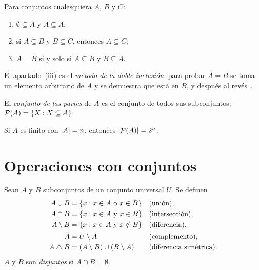 \begin{proposicion}\label{prop:t1-subconj}
Para conjuntos cualesquiera $A$, $B$ y $C$:
\begin{enumerate}
  \item $\emptyset\subseteq A$ y $A\subseteq A$;
  \item si $A\subseteq B$ y $B\subseteq C$, entonces $A\subseteq C$;
  \item $A=B$ si y solo si $A\subseteq B$ y $B\subseteq A$.
\end{enumerate}
\end{proposicion}

El apartado~(iii) es el \emph{método de la doble inclusión}: para probar $A=B$ se toma un elemento arbitrario de $A$ y se demuestra que está en $B$, y después al revés~\cite[§8.3]{hammack}.

\begin{definicion}
El \emph{conjunto de las partes} de $A$ es el conjunto de todos sus subconjuntos: $\mathcal{P}(A)=\{X : X\subseteq A\}$.
\end{definicion}

\begin{teorema}\label{teo:t1-partes}
Si $A$ es finito con $\lvert A\rvert=n$, entonces $\lvert\mathcal{P}(A)\rvert=2^{n}$.
\end{teorema}

\addtocounter{definicion}{1}%

\section{Operaciones con conjuntos}

\begin{definicion}[Operaciones]
Sean $A$ y $B$ subconjuntos de un conjunto universal $U$. Se definen
\begin{align*}
A\cup B&=\{x : x\in A\ \text{o}\ x\in B\} &&\text{(unión)},\\
A\cap B&=\{x : x\in A\ \text{y}\ x\in B\} &&\text{(intersección)},\\
A\setminus B&=\{x : x\in A\ \text{y}\ x\notin B\} &&\text{(diferencia)},\\
\overline{A}&=U\setminus A &&\text{(complemento)},\\
A\mathbin{\triangle} B&=(A\setminus B)\cup(B\setminus A) &&\text{(diferencia simétrica)}.
\end{align*}
$A$ y $B$ son \emph{disjuntos} si $A\cap B=\emptyset$.
\end{definicion}

